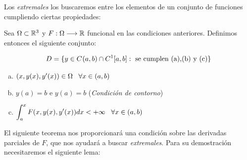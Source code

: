 Los \textit{extremales} los buscaremos entre los elementos de un conjunto de funciones cumpliendo ciertas propiedades:

\begin{definition}
\label{espaciofuncionesbuenas}

Sea $\Omega\subset\R^3$ y $F:\Omega\longrightarrow \R$ funcional en las condiciones anteriores. Definimos entonces el siguiente conjunto:

\begin{equation}\label{espaciofunciones}
D=\{y\in\continuasabierto\cap\continuas[1]: \text{ se cumplen (a),(b) y (c)}\}
\end{equation}

\begin{enumerate}[(a)]

\item $(x,y(x),y'(x))\in\Omega \espacio \forall x\in\xcero$
\item $y(a)=b$ e $y(a)=b$ (\textit{Condición de contorno})
\item $\displaystyle\int_{a}^x\fvariaciones dx<+\infty \espacio \forall x\in \xcero$ 
\end{enumerate}

\end{definition}

El siguiente teorema nos proporcionará una condición sobre las derivadas parciales de $F$, que nos ayudará a buscar \textit{extremales}. Para su demostración necesitaremos el siguiente lema:

